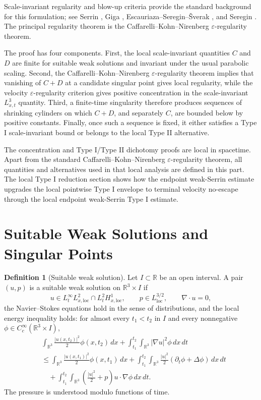 \documentclass[11pt]{amsart}
\theoremstyle{plain}
\theoremstyle{definition}
\newtheorem{definition}[definition]{Definition}
\theoremstyle{remark}
\numberwithin{equation}{section}
\begin{document}
Scale-invariant regularity and blow-up criteria provide the standard background
for this formulation; see Serrin \cite{Serrin1962}, Giga \cite{Giga1986},
Escauriaza--Seregin--{\v S}verak \cite{ESS2003}, and Seregin
\cite{Seregin2012}.  The principal regularity theorem is the
Caffarelli--Kohn--Nirenberg \(\varepsilon\)-regularity theorem.

The proof has four components.  First, the local scale-invariant
quantities \(C\) and \(D\) are finite for suitable weak solutions and invariant
under the usual parabolic scaling.  Second, the Caffarelli--Kohn--Nirenberg
\(\varepsilon\)-regularity theorem implies that vanishing of \(C+D\) at a
candidate singular point gives local regularity, while the velocity
\(\varepsilon\)-regularity criterion gives positive concentration in the
scale-invariant \(L^3_{x,t}\) quantity.  Third, a finite-time singularity
therefore produces sequences of shrinking cylinders on which \(C+D\), and
separately \(C\), are bounded below by positive constants.  Finally, once such
a sequence is fixed, it either satisfies a Type I scale-invariant bound or
belongs to the local Type II alternative.

The concentration and Type I/Type II dichotomy proofs are local in
spacetime.  Apart from the standard Caffarelli--Kohn--Nirenberg
\(\varepsilon\)-regularity theorem, all quantities and alternatives used in
that local analysis are defined in this part.  The local Type I reduction section
shows how the endpoint weak-Serrin estimate upgrades the local pointwise Type I
envelope to terminal velocity no-escape through the local endpoint weak-Serrin
Type I estimate.

\section{Suitable Weak Solutions and Singular Points}

\begin{definition}[Suitable weak solution]
Let \(I\subset\mathbb R\) be an open interval.  A pair \((u,p)\) is a suitable
weak solution on \(\mathbb R^3\times I\) if
\[
  u\in L^\infty_tL^2_{x,\mathrm{loc}}
  \cap L^2_tH^1_{x,\mathrm{loc}},
  \qquad
  p\in L^{3/2}_{\mathrm{loc}},
  \qquad
  \nabla\cdot u=0,
\]
the Navier--Stokes equations hold in the sense of distributions, and the local
energy inequality holds: for almost every \(t_1<t_2\) in \(I\) and every
nonnegative \(\phi\in C_c^\infty(\mathbb R^3\times I)\),
\[
\begin{aligned}
&\int_{\mathbb R^3}\frac{|u(x,t_2)|^2}{2}\phi(x,t_2)\,dx
 +\int_{t_1}^{t_2}\int_{\mathbb R^3}|\nabla u|^2\phi\,dx\,dt \\
&\le
 \int_{\mathbb R^3}\frac{|u(x,t_1)|^2}{2}\phi(x,t_1)\,dx
 +\int_{t_1}^{t_2}\int_{\mathbb R^3}
   \frac{|u|^2}{2}(\partial_t\phi+\Delta\phi)\,dx\,dt \\
&\quad
 +\int_{t_1}^{t_2}\int_{\mathbb R^3}
   \left(\frac{|u|^2}{2}+p\right)u\cdot\nabla\phi\,dx\,dt .
\end{aligned}
\]
The pressure is understood modulo functions of time.
\end{definition}
\end{document}
